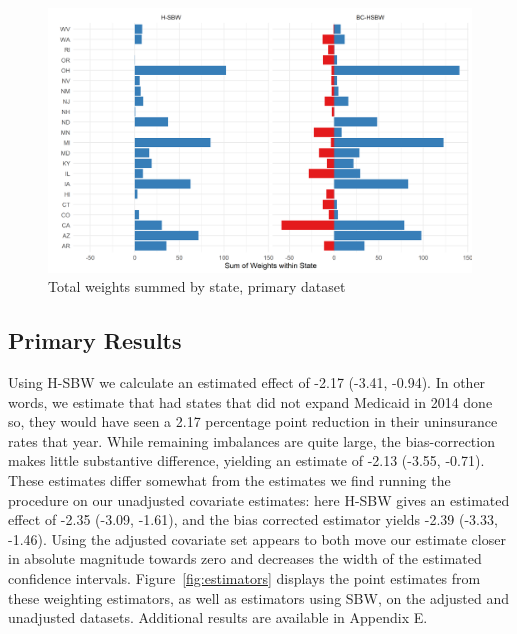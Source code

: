 \documentclass[aoas]{imsart}
\theoremstyle{plain}
\theoremstyle{remark}
\begin{document}
\begin{figure}[B]
\begin{center}
    \caption{Total weights summed by state, primary dataset}
    \label{fig:statewghts}
    \includegraphics[scale=0.6]{01_Plots/weights-by-state-hsbw-c1.png}
\end{center}
\end{figure}

\subsection{Primary Results}

Using H-SBW we calculate an estimated effect of -2.17 (-3.41, -0.94). In other words, we estimate that had states that did not expand Medicaid in 2014 done so, they would have seen a 2.17 percentage point reduction in their uninsurance rates that year. While remaining imbalances are quite large, the bias-correction makes little substantive difference, yielding an estimate of -2.13 (-3.55, -0.71). These estimates differ somewhat from the estimates we find running the procedure on our unadjusted covariate estimates: here H-SBW gives an estimated effect of -2.35 (-3.09, -1.61), and the bias corrected estimator yields -2.39 (-3.33, -1.46). Using the adjusted covariate set appears to both move our estimate closer in absolute magnitude towards zero and decreases the width of the estimated confidence intervals. Figure~\ref{fig:estimators} displays the point estimates from these weighting estimators, as well as estimators using SBW, on the adjusted and unadjusted datasets. Additional results are available in Appendix E.
\end{document}
